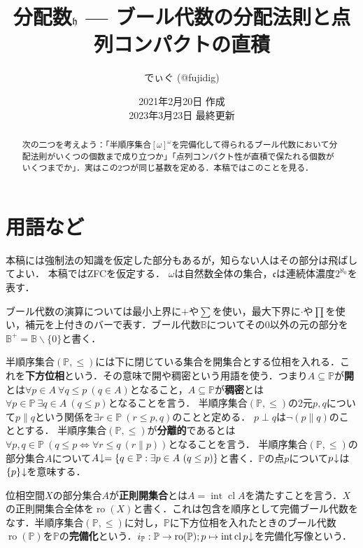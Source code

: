 \documentclass[uplatex,dvipdfmx]{jsarticle}
\title{分配数$\mathfrak{h}$ — ブール代数の分配法則と点列コンパクトの直積}
\author{でぃぐ (@fujidig)}
\date{2021年2月20日 作成 \\ 2023年3月23日 最終更新}
\renewcommand{\P}{\mathbb{P}}
\newcommand{\B}{\mathbb{B}}
\newcommand{\cl}{\operatorname{cl}}
\newcommand{\intr}{\operatorname{int}}
\newcommand{\ro}{\operatorname{ro}}
\newcommand{\frakc}{\mathfrak{c}}
\newcommand{\down}{\hspace{-0.2em}\downarrow}
\renewcommand\subset{\subseteq}
\renewcommand{\setminus}{\smallsetminus}
\theoremstyle{definition}
\theoremstyle{named}
\begin{document}
\maketitle

\begin{abstract}
次の二つを考えよう：「半順序集合$[\omega]^\omega$を完備化して得られるブール代数において分配法則がいくつの個数まで成り立つか」「点列コンパクト性が直積で保たれる個数がいくつまでか」．実はこの2つが同じ基数を定める．本稿ではこのことを見る．
\end{abstract}

\tableofcontents

\vspace{0.3cm}

\section{用語など}

本稿には強制法の知識を仮定した部分もあるが，知らない人はその部分は飛ばしてよい．
本稿ではZFCを仮定する．
$\omega$は自然数全体の集合，$\frakc$は連続体濃度$2^{\aleph_0}$を表す．

ブール代数の演算については最小上界に$+$や$\sum$を使い，最大下界に$\cdot$や$\prod$を使い，補元を上付きのバーで表す．ブール代数$\B$についてその$0$以外の元の部分を$\B^+=\B\setminus\{0\}$と書く．

半順序集合$(\P, \le)$には下に閉じている集合を開集合とする位相を入れる．これを{\bfseries 下方位相}という．その意味で開や稠密という用語を使う．つまり$A \subset \P$が{\bfseries 開}とは$\forall p \in A \ \forall q \le p\ (q \in A)$となること，$A \subset \P$が{\bfseries 稠密}とは$\forall p \in \P\ \exists q \in A\ (q \le p)$となることを言う．
半順序集合$(\P, \le)$の2元$p, q$について$p \parallel q$という関係を$\exists r \in \P\ (r \le p, q)$のことと定める．
$p \perp q$は$\neg (p \parallel q)$のこととする．
半順序集合$(\P, \le)$が{\bfseries 分離的}であるとは$\forall p, q \in \P\ (q \le p \Leftrightarrow \forall r \le q\ (r \parallel p))$となることを言う．
半順序集合$(\P, \le)$の部分集合$A$について$A \down = \{ q \in \P : \exists p \in A\ (q \le p) \}$と書く．$\P$の点$p$について$p \down$は$\{p\} \down$を意味する．

位相空間$X$の部分集合$A$が{\bfseries 正則開集合}とは$A = \intr \cl A$を満たすことを言う．$X$の正則開集合全体を$\ro(X)$と書く．これは包含を順序として完備ブール代数をなす．半順序集合$(\P, \le)$に対し，$\P$に下方位相を入れたときのブール代数$\ro(\P)$を$\P$の{\bfseries 完備化}という．$i_\P: \P \to \ro(\P); p \mapsto \intr \cl p \down$を完備化写像という．
\end{document}
